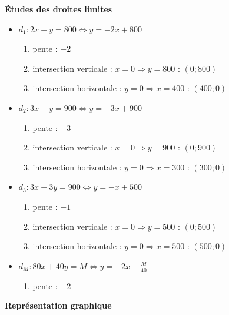 \begin{exemple}
\textbf{Études des droites limites}
\begin{itemize}
	\item $d_1 : 2x+y = 800 \Leftrightarrow y = -2x+800$
			\begin{enumerate}
				\item pente : $-2$
				\item intersection verticale : $x=0 \Rightarrow y = 800$ : $(0;800)$
				\item intersection horizontale : $y=0 \Rightarrow x = 400$ : $(400;0)$
			\end{enumerate}
	\item $d_2 : 3x+y = 900 \Leftrightarrow y = -3x+900$
			\begin{enumerate}
				\item pente : $-3$
				\item intersection verticale : $x=0 \Rightarrow y = 900$ : $(0;900)$
				\item intersection horizontale : $y=0 \Rightarrow x = 300$ : $(300;0)$
			\end{enumerate}
	\item $d_3 : 3x+3y = 900 \Leftrightarrow y = -x+500$
			\begin{enumerate}
				\item pente : $-1$
				\item intersection verticale : $x=0 \Rightarrow y = 500$ : $(0;500)$
				\item intersection horizontale : $y=0 \Rightarrow x = 500$ : $(500;0)$
			\end{enumerate}
	\item $d_M : 80x+40y = M \Leftrightarrow y = -2x+\frac{M}{40}$
			\begin{enumerate}
				\item pente : $-2$
			\end{enumerate}
\end{itemize}

\textbf{Représentation graphique}


\end{exemple}
